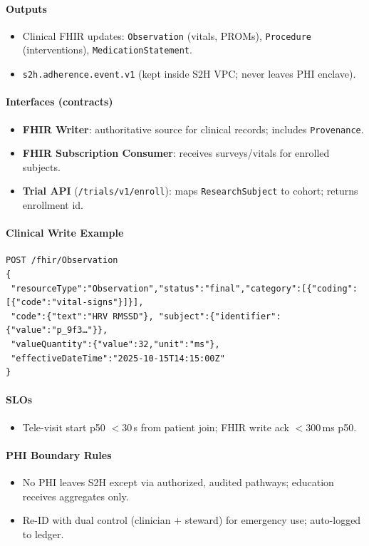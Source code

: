 \documentclass[11pt]{article}
\theoremstyle{plain}
\begin{document}
\paragraph{Outputs}
\begin{itemize}
  \item Clinical FHIR updates: \texttt{Observation} (vitals, PROMs), \texttt{Procedure} (interventions), \texttt{MedicationStatement}.
  \item \texttt{s2h.adherence.event.v1} (kept inside S2H VPC; never leaves PHI enclave).
\end{itemize}

\paragraph{Interfaces (contracts)}
\begin{itemize}
  \item \textbf{FHIR Writer}: authoritative source for clinical records; includes \texttt{Provenance}.
  \item \textbf{FHIR Subscription Consumer}: receives surveys/vitals for enrolled subjects.
  \item \textbf{Trial API} (\texttt{/trials/v1/enroll}): maps \texttt{ResearchSubject} to cohort; returns enrollment id.
\end{itemize}

\paragraph{Clinical Write Example}
\begin{verbatim}
POST /fhir/Observation
{
 "resourceType":"Observation","status":"final","category":[{"coding":[{"code":"vital-signs"}]}],
 "code":{"text":"HRV RMSSD"}, "subject":{"identifier":{"value":"p_9f3…"}},
 "valueQuantity":{"value":32,"unit":"ms"},
 "effectiveDateTime":"2025-10-15T14:15:00Z"
}
\end{verbatim}

\paragraph{SLOs}
\begin{itemize}
  \item Tele-visit start p50 $<30$\,s from patient join; FHIR write ack $<300$\,ms p50.
\end{itemize}

\paragraph{PHI Boundary Rules}
\begin{itemize}
  \item No PHI leaves S2H except via authorized, audited pathways; education receives aggregates only.
  \item Re-ID with dual control (clinician + steward) for emergency use; auto-logged to ledger.
\end{itemize}
\end{document}
